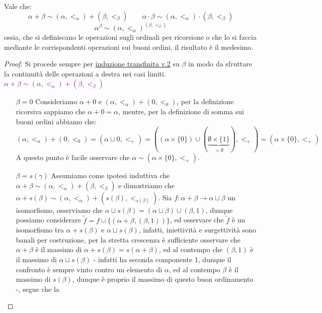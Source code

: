 \begin{proposition}
	Vale che:
	\[ \alpha + \beta \sim (\alpha,<_\alpha) + (\beta,<_\beta) \qquad \alpha \cdot \beta \sim (\alpha,<_\alpha) \cdot (\beta,<_\beta) 
		\]\[ \alpha^\beta \sim (\alpha,<_\alpha)^{(\beta,<_\beta) }
			\]
	ossia, che si definiscano le operazioni sugli ordinali per ricorsione o che lo si faccia mediante le corrispondenti operazioni sui buoni ordini, il risultato è il medesimo.
\end{proposition}

\begin{proof}
	Si procede sempre per \hyperref[induz_transf2]{induzione transfinita v.2} su $\beta$ in modo da sfruttare la continuità delle operazioni a destra nei casi limiti.\\
	\textcolor{purple}{$\alpha + \beta \sim (\alpha,<_\alpha) + (\beta,<_\beta)$}
	\begin{itemize}
		\item[$\boxed{\beta = 0}$] Consideriamo $\alpha + 0$ e $(\alpha,<_\alpha) + (0,<_0)$, per la definizione ricorsiva sappiamo che $\alpha + 0 = \alpha$, mentre, per la definizione di somma sui buoni ordini abbiamo che:
		\[ (\alpha,<_\alpha) + (0,<_0) = (\alpha \sqcup 0, <_+) = ((\alpha \times \{0\}) \cup (\underbrace{\emptyset \times \{1\}}_{= \emptyset}),<_+) = (\alpha \times \{0\},<_+)
			\]
		A questo punto è facile osservare che $\alpha \sim (\alpha \times \{0\},<_+)$.
		\item[$\boxed{\beta = s(\gamma)}$] Assumiamo come ipotesi induttiva che $\alpha + \beta \sim (\alpha,<_\alpha) + (\beta,<_\beta)$ e dimostriamo che $\alpha + s(\beta) \sim (\alpha,<_\alpha) + (s(\beta),<_{s(\beta)})$.
		Sia $f : \alpha + \beta \to \alpha \sqcup \beta$ un isomorfismo, osserviamo che $\alpha \sqcup s(\beta) = (\alpha \sqcup \beta) \cup (\beta,1)$, dunque possiamo considerare $\widetilde{f} = f \cup \{(\alpha + \beta,(\beta,1))\}$,
		ed osservare che $\widetilde{f}$ è un isomorfismo tra $\alpha + s(\beta)$ e $\alpha \sqcup s(\beta)$, infatti, iniettività e surgettività sono banali per costruzione, per la stretta crescenza è sufficiente osservare che $\alpha + \beta$ è il massimo di $\alpha + s(\beta) = s(\alpha + \beta)$,
		ed al contempo che $(\beta,1)$ è il massimo di $\alpha \sqcup s(\beta)$ - infatti ha seconda componente 1, dunque il confronto è sempre vinto contro un elemento di $\alpha$, ed al contempo $\beta$ è il massimo di $s(\beta)$, dunque è proprio il massimo di questo buon ordinamento -, segue che la 

\end{itemize}
\end{proof}
